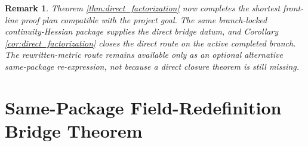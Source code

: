 \documentclass[11pt]{article}
\newtheorem{remark}{Remark}
\begin{document}
\begin{remark}
Theorem \ref{thm:direct_factorization} now completes the shortest front-line proof plan compatible with the project goal. The same branch-locked continuity-Hessian package supplies the direct bridge datum, and Corollary \ref{cor:direct_factorization} closes the direct route on the active completed branch. The rewritten-metric route remains available only as an optional alternative same-package re-expression, not because a direct closure theorem is still missing.
\end{remark}

\section{Same-Package Field-Redefinition Bridge Theorem}
\end{document}
